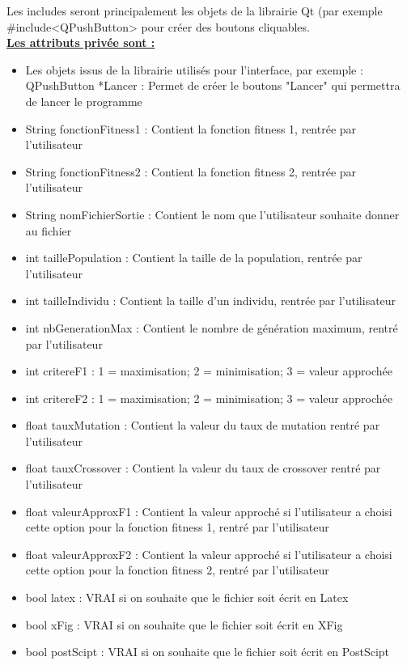 \documentclass[a4paper,11pt]{article}
\begin{document}
			
			Les includes seront principalement les objets de la librairie Qt 
			(par exemple \#include<QPushButton> pour créer des boutons cliquables.
			\\
			\underline{\bf Les attributs privée sont :}\\
				\begin{itemize}
				\item Les objets issus de la librairie utilisés pour l'interface, par exemple :\\
					QPushButton *Lancer : Permet de créer le boutons "Lancer" qui permettra de lancer le programme\vspace{0.2cm}
				\item String fonctionFitness1 : Contient la fonction fitness 1, rentrée par l'utilisateur
				\item String fonctionFitness2 : Contient la fonction fitness 2, rentrée par l'utilisateur
				\item String nomFichierSortie : Contient le nom que l'utilisateur souhaite donner au fichier
				\item int taillePopulation : Contient la taille de la population, rentrée par l'utilisateur
				\item int tailleIndividu : Contient la taille d'un individu, rentrée par l'utilisateur
				\item int nbGenerationMax : Contient le nombre de génération maximum, rentré par l'utilisateur
				\item int critereF1 : 1  = maximisation; 2 = minimisation; 3 = valeur approchée
				\item int critereF2 : 1  = maximisation; 2 = minimisation; 3 = valeur approchée
				\item float tauxMutation : Contient la valeur du taux de mutation rentré par l'utilisateur
				\item float tauxCrossover : Contient la valeur du taux de crossover rentré par l'utilisateur
				\item float valeurApproxF1 : Contient la valeur approché si l'utilisateur a choisi cette option pour la fonction fitness 1, rentré par l'utilisateur
				\item float valeurApproxF2 : Contient la valeur approché si l'utilisateur a choisi cette option pour la fonction fitness 2, rentré par l'utilisateur
				\item bool latex : VRAI si on souhaite que le fichier soit écrit en Latex
				\item bool xFig : VRAI si on souhaite que le fichier soit écrit en XFig
				\item bool postScipt : VRAI si on souhaite que le fichier soit écrit en PostScipt\\
			\end{itemize}
\end{document}
